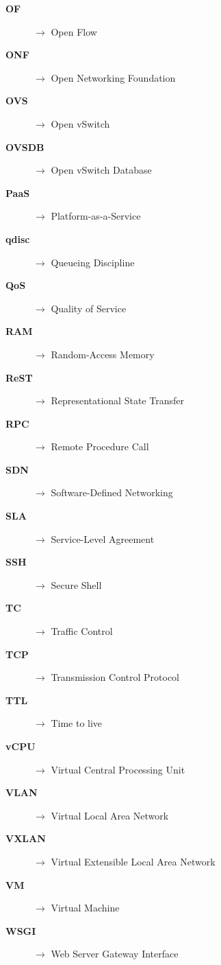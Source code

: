 \begin{description}
\item[\bf{OF}] $\rightarrow$ Open Flow
\item[\bf{ONF}] $\rightarrow$ Open Networking Foundation
\item[\bf{OVS}] $\rightarrow$ Open vSwitch
\item[\bf{OVSDB}] $\rightarrow$ Open vSwitch Database
\item[\bf{PaaS}] $\rightarrow$ Platform-as-a-Service
\item[\bf{qdisc}] $\rightarrow$ Queueing Discipline
\item[\bf{QoS}] $\rightarrow$ Quality of Service
\item[\bf{RAM}] $\rightarrow$ Random-Access Memory
\item[\bf{ReST}] $\rightarrow$ Representational State Transfer
\item[\bf{RPC}] $\rightarrow$ Remote Procedure Call
\item[\bf{SDN}] $\rightarrow$ Software-Defined Networking
\item[\bf{SLA}] $\rightarrow$ Service-Level Agreement
\item[\bf{SSH}] $\rightarrow$ Secure Shell
\item[\bf{TC}] $\rightarrow$ Traffic Control
\item[\bf{TCP}] $\rightarrow$ Transmission Control Protocol
\item[\bf{TTL}] $\rightarrow$ Time to live
\item[\bf{vCPU}] $\rightarrow$ Virtual Central Processing Unit
\item[\bf{VLAN}] $\rightarrow$ Virtual Local Area Network
\item[\bf{VXLAN}] $\rightarrow$ Virtual Extensible Local Area Network
\item[\bf{VM}] $\rightarrow$ Virtual Machine
\item[\bf{WSGI}] $\rightarrow$ Web Server Gateway Interface

\end{description}




